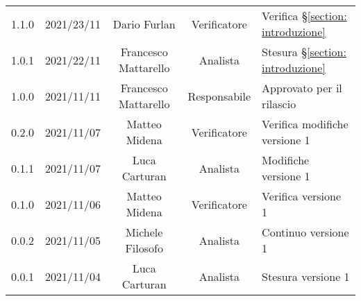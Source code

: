 \begin{center}
\begin{longtable}[c]{c | c | c | c | p{5cm}}
		1.1.0 & 2021/23/11 & Dario Furlan & Verificatore & Verifica §\ref{section: introduzione} \\
		1.0.1 & 2021/22/11 & Francesco Mattarello & Analista & Stesura §\ref{section: introduzione}\\
		1.0.0 & 2021/11/11 & Francesco Mattarello & Responsabile & Approvato per il rilascio\\
		0.2.0 & 2021/11/07 & Matteo Midena & Verificatore & Verifica modifiche versione 1\\
		0.1.1 & 2021/11/07 & Luca Carturan & Analista & Modifiche versione 1\\
		0.1.0 & 2021/11/06 & Matteo Midena & Verificatore & Verifica versione 1\\
		0.0.2 & 2021/11/05 & Michele Filosofo & Analista & Continuo versione 1\\
		0.0.1 & 2021/11/04 & Luca Carturan & Analista &Stesura versione 1\\

	\end{longtable}
\end{center}

